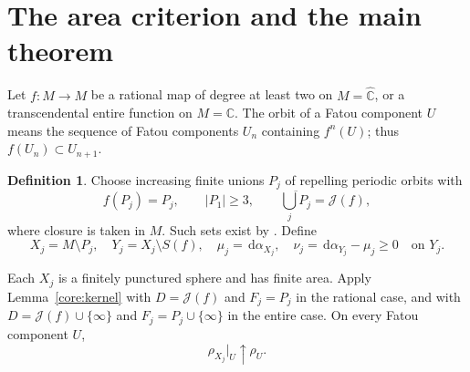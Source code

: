 \documentclass[11pt,reqno]{amsart}
\newcommand{\C}{\mathbb C}
\newcommand{\sphere}{\widehat{\mathbb C}}
\newcommand{\Jul}{\mathcal J}
\newcommand{\dd}{\,\mathrm d}
\theoremstyle{definition}
\newtheorem{definition}[theorem]{Definition}
\numberwithin{equation}{section}
\begin{document}
\section{The area criterion and the main theorem}\label{sec:global}

Let $f:M\to M$ be a rational map of degree at least two on $M=\sphere$,
or a transcendental entire function on $M=\C$.
The orbit of a Fatou component $U$ means the sequence of Fatou
components $U_n$ containing $f^n(U)$; thus $f(U_n)\subset U_{n+1}$.

\begin{definition}\label{def:marking}
Choose increasing finite unions $P_j$ of repelling periodic orbits with
\begin{equation}\label{core:marks}
 f(P_j)=P_j,\qquad |P_1|\ge3,\qquad
 \overline{\bigcup_jP_j}=\Jul(f),
\end{equation}
where closure is taken in $M$. Such sets exist by
\cite[Theorem~4]{Bergweiler}. Define
\begin{equation}\label{core:background}
 X_j=M\setminus P_j,\quad Y_j=X_j\setminus S(f),\quad
 \mu_j=\dd\alpha_{X_j},\quad
 \nu_j=\dd\alpha_{Y_j}-\mu_j\ge0\quad\text{on }Y_j.
\end{equation}
\end{definition}

Each $X_j$ is a finitely punctured sphere and has finite area.
Apply Lemma~\ref{core:kernel} with $D=\Jul(f)$ and $F_j=P_j$ in the
rational case, and with $D=\Jul(f)\cup\{\infty\}$ and
$F_j=P_j\cup\{\infty\}$ in the entire case. On every Fatou component $U$,
\begin{equation}\label{core:recovery}
 \rho_{X_j}|_U\uparrow\rho_U.
\end{equation}
\end{document}
